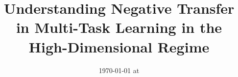 \documentclass{article}
\begin{document}
\title{Understanding Negative Transfer in Multi-Task Learning in the High-Dimensional Regime}
\date{}
\maketitle
\date{{\ddmmyyyydate\today} at \currenttime}












\newpage
\appendix




\end{document}
